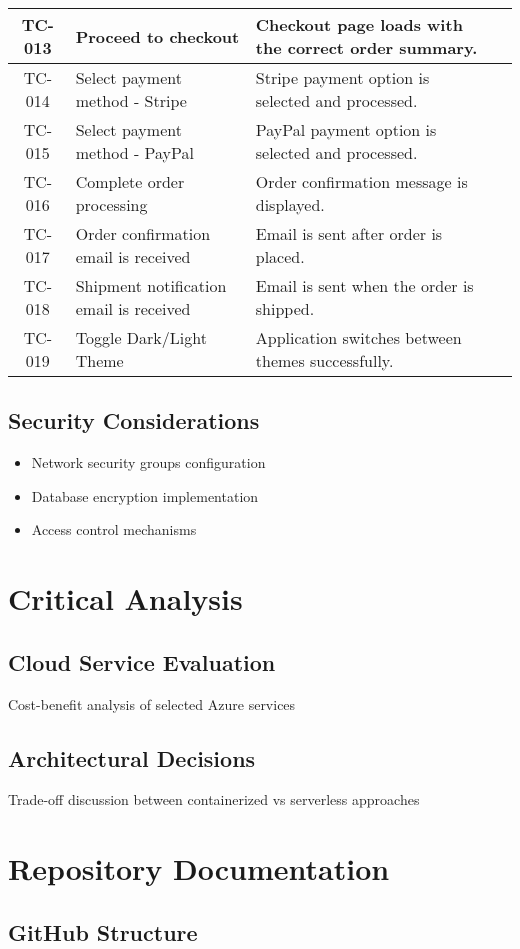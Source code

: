 \documentclass{llncs}
\begin{document}
\begin{longtable}{|c|p{4.5cm}|p{4.5cm}|c|}
TC-013 & Proceed to checkout & Checkout page loads with the correct order summary. & \\ \hline
TC-014 & Select payment method - Stripe & Stripe payment option is selected and processed. & \\ \hline
TC-015 & Select payment method - PayPal & PayPal payment option is selected and processed. & \\ \hline
TC-016 & Complete order processing & Order confirmation message is displayed. & \\ \hline
TC-017 & Order confirmation email is received & Email is sent after order is placed. & \\ \hline
TC-018 & Shipment notification email is received & Email is sent when the order is shipped. & \\ \hline
TC-019 & Toggle Dark/Light Theme & Application switches between themes successfully. & \\ \hline
\end{longtable}

\subsection{Security Considerations}
\begin{itemize}
    \item Network security groups configuration
    \item Database encryption implementation
    \item Access control mechanisms
\end{itemize}

\section{Critical Analysis}
\subsection{Cloud Service Evaluation}
Cost-benefit analysis of selected Azure services
\subsection{Architectural Decisions}
Trade-off discussion between containerized vs serverless approaches

\section{Repository Documentation}
\subsection{GitHub Structure}
\end{document}
